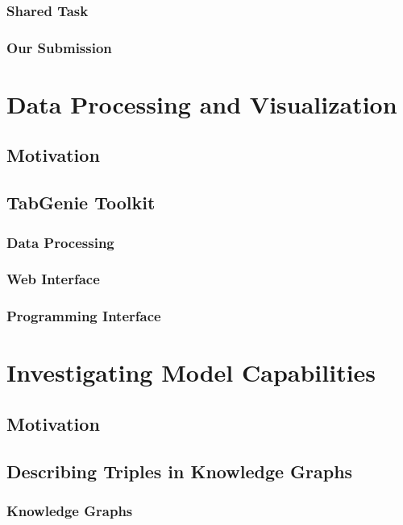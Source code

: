 \documentclass[12pt,notitlepage,a4paper,openright]{report}
\begin{document}
\subsection{Shared Task}
\label{sec:eval-st}
\subsection{Our Submission}
\label{sec:eval-ours}

\chapter{Data Processing and Visualization}
\label{chap:tabgenie}
\section{Motivation}
\label{sec:data-mot}
\section{TabGenie Toolkit}
\label{sec:tabgenie}
\subsection{Data Processing}
\label{sec:tabgenie-data}
\subsection{Web Interface}
\label{sec:tabgenie-web}
\subsection{Programming Interface}
\label{sec:tabgenie-cli}


\chapter{Investigating Model Capabilities}
\label{chap:investigating}
\section{Motivation}
\label{sec:investigating-mot}
\section{Describing Triples in Knowledge Graphs}
\label{sec:describing}
\subsection{Knowledge Graphs}
\label{sec:kgs}
\end{document}
